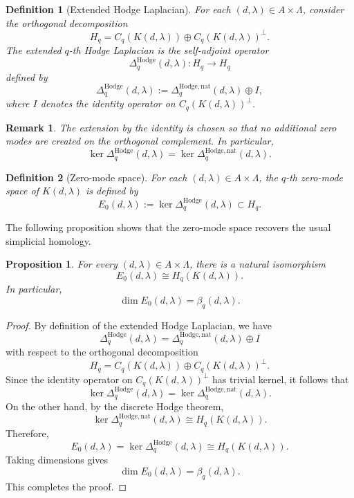 \documentclass[pdflatex,sn-mathphys-num]{sn-jnl}%
\theoremstyle{thmstyleone}%
\newtheorem{proposition}[theorem]{Proposition}%
\theoremstyle{thmstyletwo}%
\newtheorem{remark}{Remark}%
\theoremstyle{thmstylethree}%
\newtheorem{definition}{Definition}%
\begin{document}
\begin{definition}[Extended Hodge Laplacian]
For each \((d,\lambda)\in A\times\Lambda\), consider the orthogonal
decomposition
\[
H_q
=
C_q(K(d,\lambda))\oplus C_q(K(d,\lambda))^\perp .
\]
The \emph{extended \(q\)-th Hodge Laplacian} is the self-adjoint operator
\[
\Delta_q^{\mathrm{Hodge}}(d,\lambda):H_q\longrightarrow H_q
\]
defined by
\[
\Delta_q^{\mathrm{Hodge}}(d,\lambda)
:=
\Delta_q^{\mathrm{Hodge},\mathrm{nat}}(d,\lambda)\oplus I,
\]
where \(I\) denotes the identity operator on
\(C_q(K(d,\lambda))^\perp\).
\end{definition}

\begin{remark}
The extension by the identity is chosen so that no additional zero modes are
created on the orthogonal complement. In particular,
\[
\ker \Delta_q^{\mathrm{Hodge}}(d,\lambda)
=
\ker \Delta_q^{\mathrm{Hodge},\mathrm{nat}}(d,\lambda).
\]
\end{remark}

\begin{definition}[Zero-mode space]
For each \((d,\lambda)\in A\times\Lambda\), the \emph{\(q\)-th zero-mode space}
of \(K(d,\lambda)\) is defined by
\[
E_0(d,\lambda)
:=
\ker \Delta_q^{\mathrm{Hodge}}(d,\lambda)
\subset H_q.
\]
\end{definition}

The following proposition shows that the zero-mode space recovers the usual
simplicial homology.

\begin{proposition}
For every \((d,\lambda)\in A\times\Lambda\), there is a natural isomorphism
\[
E_0(d,\lambda)\cong H_q(K(d,\lambda)).
\]
In particular,
\[
\dim E_0(d,\lambda)=\beta_q(d,\lambda).
\]
\end{proposition}

\begin{proof}
By definition of the extended Hodge Laplacian, we have
\[
\Delta_q^{\mathrm{Hodge}}(d,\lambda)
=
\Delta_q^{\mathrm{Hodge},\mathrm{nat}}(d,\lambda)\oplus I
\]
with respect to the orthogonal decomposition
\[
H_q
=
C_q(K(d,\lambda))\oplus C_q(K(d,\lambda))^\perp .
\]
Since the identity operator on \(C_q(K(d,\lambda))^\perp\) has trivial kernel,
it follows that
\[
\ker \Delta_q^{\mathrm{Hodge}}(d,\lambda)
=
\ker \Delta_q^{\mathrm{Hodge},\mathrm{nat}}(d,\lambda).
\]
On the other hand, by the discrete Hodge theorem,
\[
\ker \Delta_q^{\mathrm{Hodge},\mathrm{nat}}(d,\lambda)
\cong
H_q(K(d,\lambda)).
\]
Therefore,
\[
E_0(d,\lambda)
=
\ker \Delta_q^{\mathrm{Hodge}}(d,\lambda)
\cong
H_q(K(d,\lambda)).
\]
Taking dimensions gives
\[
\dim E_0(d,\lambda)=\beta_q(d,\lambda).
\]
This completes the proof.
\end{proof}
\end{document}
